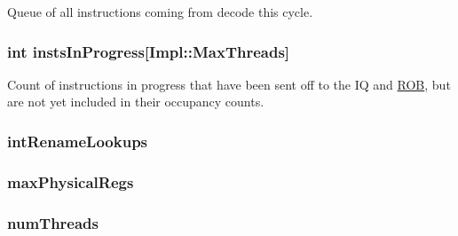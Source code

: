 \label{classDefaultRename_a4b6cd9f78efe8b5101b48dbf35a43c11}
Queue of all instructions coming from decode this cycle. \hypertarget{classDefaultRename_af301c62fee41266f36b1318688c8aa55}{
\subsubsection[{instsInProgress}]{\setlength{\rightskip}{0pt plus 5cm}int {\bf instsInProgress}\mbox{[}Impl::MaxThreads\mbox{]}}}
\label{classDefaultRename_af301c62fee41266f36b1318688c8aa55}
Count of instructions in progress that have been sent off to the IQ and \hyperlink{classROB}{ROB}, but are not yet included in their occupancy counts. \hypertarget{classDefaultRename_ae2548cb038c1868f0dcf4c5df1154b12}{
\subsubsection[{intRenameLookups}]{ {\bf intRenameLookups}}}
\label{classDefaultRename_ae2548cb038c1868f0dcf4c5df1154b12}
\hypertarget{classDefaultRename_acc18d044ab2bf32e6515938485638d28}{
\subsubsection[{maxPhysicalRegs}]{ {\bf maxPhysicalRegs}}}
\label{classDefaultRename_acc18d044ab2bf32e6515938485638d28}
\hypertarget{classDefaultRename_a88377f855dbf5adeeecb06b5bb821d35}{
\subsubsection[{numThreads}]{ {\bf numThreads}}}
